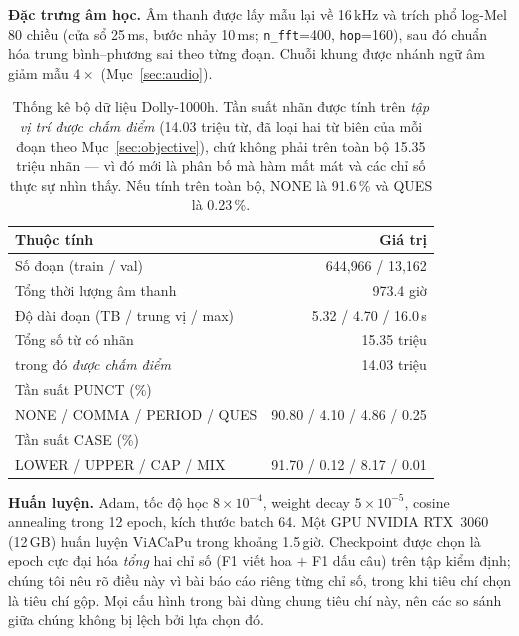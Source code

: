\documentclass[conference,onecolumn]{IEEEtran}
\begin{document}
\textbf{Đặc trưng âm học.} Âm thanh được lấy mẫu lại về 16\,kHz và trích phổ
log-Mel 80 chiều (cửa sổ 25\,ms, bước nhảy 10\,ms; \texttt{n\_fft}=400,
\texttt{hop}=160), sau đó chuẩn hóa trung bình--phương sai theo từng đoạn. Chuỗi
khung được nhánh ngữ âm giảm mẫu $4\times$ (Mục~\ref{sec:audio}).

\begin{table}[htbp]
\caption{Thống kê bộ dữ liệu Dolly-1000h. Tần suất nhãn được tính trên
\emph{tập vị trí được chấm điểm} (14.03 triệu từ, đã loại hai từ biên của mỗi
đoạn theo Mục~\ref{sec:objective}), chứ không phải trên toàn bộ 15.35 triệu nhãn
--- vì đó mới là phân bố mà hàm mất mát và các chỉ số thực sự nhìn thấy. Nếu
tính trên toàn bộ, NONE là 91.6\,\% và QUES là 0.23\,\%.}
\label{tab:data}
\centering
\setlength{\tabcolsep}{8pt}
\begin{tabular}{lr}
\toprule
Thuộc tính & Giá trị \\
\midrule
Số đoạn (train / val)        & 644{,}966 / 13{,}162 \\
Tổng thời lượng âm thanh     & 973.4 giờ \\
Độ dài đoạn (TB / trung vị / max) & 5.32 / 4.70 / 16.0\,s \\
Tổng số từ có nhãn           & 15.35 triệu \\
\quad trong đó \emph{được chấm điểm}  & 14.03 triệu \\
\midrule
Tần suất PUNCT (\%) & \\
\quad NONE / COMMA / PERIOD / QUES & 90.80 / 4.10 / 4.86 / 0.25 \\
Tần suất CASE (\%) & \\
\quad LOWER / UPPER / CAP / MIX    & 91.70 / 0.12 / 8.17 / 0.01 \\
\bottomrule
\end{tabular}
\end{table}

\textbf{Huấn luyện.} Adam, tốc độ học $8\times10^{-4}$, weight decay
$5\times10^{-5}$, cosine annealing trong 12 epoch, kích thước batch 64. Một GPU
NVIDIA RTX~3060 (12\,GB) huấn luyện ViACaPu trong khoảng 1.5\,giờ. Checkpoint
được chọn là epoch cực đại hóa \emph{tổng} hai chỉ số (F1 viết hoa $+$ F1 dấu
câu) trên tập kiểm định; chúng tôi nêu rõ điều này vì bài báo cáo riêng từng chỉ
số, trong khi tiêu chí chọn là tiêu chí gộp. Mọi cấu hình trong bài dùng chung
tiêu chí này, nên các so sánh giữa chúng không bị lệch bởi lựa chọn đó.
\end{document}

